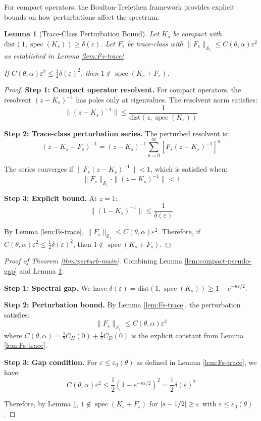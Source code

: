 \documentclass[11pt,a4paper]{article}
\newtheorem{lemma}[theorem]{Lemma}
\theoremstyle{definition}
\theoremstyle{remark}
\DeclareMathOperator{\spec}{spec}
\let\Re\relax
\DeclareMathOperator{\Re}{Re}
\begin{document}
For compact operators, the Boulton-Trefethen framework provides explicit bounds on how perturbations affect the spectrum.

\begin{lemma}[Trace-Class Perturbation Bound]\label{lem:trace-class-bound}
Let $K_s$ be compact with $\text{dist}(1, \spec(K_s)) \geq \delta(\varepsilon)$. Let $F_s$ be trace-class with $\|F_s\|_{\mathcal{S}_1} \leq C(\theta,\alpha)\varepsilon^2$ as established in Lemma \ref{lem:Fs-trace}.

If $C(\theta,\alpha)\varepsilon^2 \leq \frac{1}{2}\delta(\varepsilon)^2$, then $1 \notin \spec(K_s + F_s)$.
\end{lemma}

\begin{proof}
\textbf{Step 1: Compact operator resolvent.} For compact operators, the resolvent $(z - K_s)^{-1}$ has poles only at eigenvalues. The resolvent norm satisfies:
\[
\|(z - K_s)^{-1}\| \leq \frac{1}{\text{dist}(z, \spec(K_s))}
\]

\textbf{Step 2: Trace-class perturbation series.} The perturbed resolvent is:
\[
(z - K_s - F_s)^{-1} = (z - K_s)^{-1} \sum_{n=0}^{\infty} [F_s(z - K_s)^{-1}]^n
\]

The series converges if $\|F_s(z - K_s)^{-1}\| < 1$, which is satisfied when:
\[
\|F_s\|_{\mathcal{S}_1} \cdot \|(z - K_s)^{-1}\| < 1
\]

\textbf{Step 3: Explicit bound.} At $z = 1$:
\[
\|(1 - K_s)^{-1}\| \leq \frac{1}{\delta(\varepsilon)}
\]

By Lemma \ref{lem:Fs-trace}, $\|F_s\|_{\mathcal{S}_1} \leq C(\theta,\alpha)\varepsilon^2$. Therefore, if $C(\theta,\alpha)\varepsilon^2 \leq \frac{1}{2}\delta(\varepsilon)^2$, then $1 \notin \spec(K_s + F_s)$.
\end{proof}

\begin{proof}[Proof of Theorem \ref{thm:perturb-main}]
Combining Lemma \ref{lem:compact-pseudo-gap} and Lemma \ref{lem:trace-class-bound}:

\textbf{Step 1: Spectral gap.} We have $\delta(\varepsilon) = \text{dist}(1, \spec(K_s)) \geq 1 - e^{-\kappa\varepsilon/2}$.

\textbf{Step 2: Perturbation bound.} By Lemma \ref{lem:Fs-trace}, the perturbation satisfies:
\[
\|F_s\|_{\mathcal{S}_1} \leq C(\theta,\alpha) \varepsilon^2
\]
where $C(\theta,\alpha) = \frac{1}{2}C_H(0) + \frac{1}{2}C_D(0)$ is the explicit constant from Lemma \ref{lem:Fs-trace}.

\textbf{Step 3: Gap condition.} For $\varepsilon \leq \varepsilon_0(\theta)$ as defined in Lemma \ref{lem:Fs-trace}, we have:
\[
C(\theta,\alpha) \varepsilon^2 \leq \frac{1}{2}(1 - e^{-\kappa\varepsilon/2})^2 = \frac{1}{2}\delta(\varepsilon)^2
\]

Therefore, by Lemma \ref{lem:trace-class-bound}, $1 \notin \spec(K_s + F_s)$ for $|\Re s - 1/2| \geq \varepsilon$ with $\varepsilon \leq \varepsilon_0(\theta)$.
\end{proof}
\end{document}
